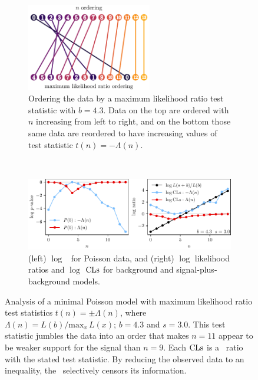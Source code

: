 \begin{figure}[tp]
\centering
\begin{subfigure}{\textwidth}
\centering
\includegraphics[width=0.6\textwidth]{figures/searches_cls_plots_with_pvals_order.pdf}
\caption{%
Ordering the data by a maximum likelihood ratio test statistic with $b=4.3$.
Data on the top are ordered with $n$ increasing from left to right,
and on the bottom those same data are reordered to have increasing values of
test statistic $t(n) = -\Lambda(n)$.
}
\end{subfigure}
\\[.5em]
\begin{subfigure}{\textwidth}
\centering
\includegraphics[width=\textwidth]{figures/searches_cls_plots_with_pvals_t.pdf}
\caption{%
(left) $\log$ \pvalues\ for Poisson data,
and (right) $\log$ likelihood ratios and $\log$ $\mathrm{CLs}$ for
background and signal-plus-background models.%
}
\end{subfigure}
\caption[
Analysis of a minimal Poisson model with maximum likelihood ratio
test statistics
]{%
Analysis of a minimal Poisson model with maximum likelihood ratio
test statistics $t(n) = \pm \Lambda(n)$,
where $\Lambda(n) = L(b)/\mathrm{max}_x\,L(x)$; $b = 4.3$ and $s = 3.0$.
This test statistic jumbles the data into an order that makes $n=11$ appear to
be weaker support for the signal than $n=9$.
Each $\mathrm{CLs}$ is a \pvalue\ ratio with the stated test statistic.
By reducing the observed data to an inequality, the \pvalue\ selectively
censors its information.
}
\label{fig:searches_sb_t}
\end{figure}

